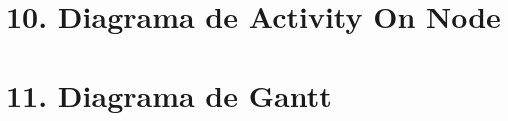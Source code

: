 \documentclass[
11pt, %
codirector, %
]{charter}
\begin{document}
\section{10. Diagrama de Activity On Node}
\label{sec:AoN}

%
%
%
%
%
%


\section{11. Diagrama de Gantt}
\label{sec:gantt}
\end{document}
